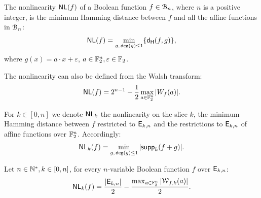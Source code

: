 \documentclass[11pt]{llncs}
\begin{document}
\begin{definition} \label{def:nl}
	The nonlinearity $\mathsf{NL}(f)$ of a Boolean function $f\in \mathcal{B}_n$, where $n$ is a positive integer, is the minimum Hamming distance between $f$ and all the affine functions in $\mathcal{B}_n$:
	\[ \mathsf{NL}(f) = \min_{g,\, \mathsf{deg}(g)\leq 1} \{ \mathsf{d_H}(f,g) \}{,} \]
	where $g(x)=a\cdot x+\varepsilon$, $a\in \mathbb{F}_2^n, \varepsilon\in \mathbb{F}_2$. 
	
	The nonlinearity can also be defined from the Walsh transform:
	\[ \mathsf{NL}(f) = 2^{n-1}- \frac{1}{2} \max_{a\in \mathbb{F}_2^n}{|W_{f}(a)|}. \]
	
	
	For $k\in [0,n]$ we denote $\mathsf{NL}_{k}$ the nonlinearity on the slice $k$, the minimum Hamming distance between $f$ restricted to $\mathsf{E}_{k,n}$ and the restrictions to $\mathsf{E}_{k,n}$ of affine functions over $\mathbb{F}_2^n$. 
	Accordingly: 
	\[\mathsf{NL}_{k}(f)=\min_{g,\, \mathsf{deg}(g)\leq 1} |\mathsf{supp}_{k}(f+g)|.\]
\end{definition}


\begin{Prop}\label{prop:nlk}
	Let $n\in \mathbb{N}^*, k\in [0,n]$, for every $n$-variable Boolean function $f$ over $\mathsf{E}_{k,n}$:
	\[ \mathsf{NL}_{k}(f)=\frac{|\mathsf{E}_{k,n}|}{2} -\frac{\max_{a\in \mathbb{F}_2^n} |\mathcal{W}_{f,k}(a)|}{2}  .\]
\end{Prop}



\end{document}
